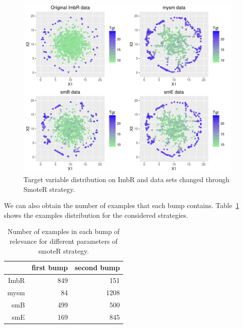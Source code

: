 \documentclass[10pt,a4paper]{article}\usepackage[]{graphicx}\usepackage[]{color}
\makeatletter
\def\maxwidth{ %
  \ifdim\Gin@nat@width>\linewidth
    \linewidth
  \else
    \Gin@nat@width
  \fi
}
\newenvironment{knitrout}{}{} %
\makeatother
\begin{document}
\begin{knitrout}\footnotesize
{}\color{fgcolor}\begin{figure}

{\centering \includegraphics[width=\maxwidth]{figures/UBL-SMOTE_plot3_dist-1} 

}

\caption[Target variable distribution on ImbR and data sets changed through SmoteR strategy]{Target variable distribution on ImbR and data sets changed through SmoteR strategy.}\label{fig:SMOTE_plot3_dist}
\end{figure}


\end{knitrout}


We can also obtain the number of examples that each bump contains. Table~\ref{tab:smoteR_1} shows the examples distribution for the considered strategies.




\begin{table}[ht]
\centering
\begin{tabular}{rrr}
  \hline
 & first bump & second bump \\ 
  \hline
ImbR & 849 & 151 \\ 
  mysm &  84 & 1208 \\ 
  smB & 499 & 500 \\ 
  smE & 169 & 845 \\ 
   \hline
\end{tabular}
\caption{Number of examples in each bump of relevance for different parameters of smoteR strategy.} 
\label{tab:smoteR_1}
\end{table}
\end{document}
